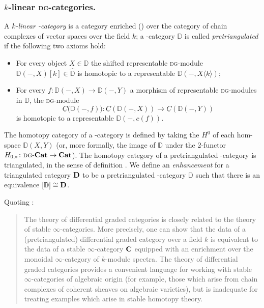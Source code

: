 \subsubsection{$k$\hyp{}linear \textsc{dg}\hyp{}categories.}
A \emph{$k$\hyp{}linear \dg\hyp{}category} is a category enriched (\cite{kelly1982basic,nashphd}) over the category of chain complexes of vector spaces over the field $k$; a \dg\hyp{}category $\mathbb{D}$ is called \emph{pretriangulated} if the following two axioms hold:
\begin{itemize}
\item For every object $X\in\mathbb{D}$ the shifted representable \textsc{dg}\hyp{}module $\mathbb{D}(-,X)[k]\in \widehat{\mathbb{D}}$ is homotopic to a representable $\mathbb{D}(-, X\langle k\rangle)$;
\item For every $f\colon \mathbb{D}(-,X)\to \mathbb{D}(-,Y)$ a morphism of representable \textsc{dg}\hyp{}modules in $\widehat{\mathbb{D}}$, the \textsc{dg}\hyp{}module
\[
\underline C\big(\mathbb{D}(-,f) \big)\colon \underline C(\mathbb{D}(-,X))\to \underline C(\mathbb{D}(-,Y))
\]
is homotopic to a representable $\mathbb{D}(-, c(f))$.
\end{itemize}
The homotopy category of a \dg\hyp{}category is defined by taking the $H^0$ of each hom-space $\mathbb{D}(X,Y)$ (or, more formally, the image of $\mathbb{D}$ under the 2\hyp{}functor $H_{0,*}\colon \text{\scshape dg}\text{-}\textbf{Cat}\to \textbf{Cat}$). The homotopy category of a pretriangulated \dg\hyp{}category is triangulated, in the sense of definition . We define an \emph{enhancement} for a triangulated category $\textbf{D}$ to be a pretriangulated \dg\hyp{}category $\mathbb{D}$ such that there is an equivalence $[\mathbb{D}]\cong \textbf{D}$.

Quoting \cite{LurieHA}:
\begin{quote}
The theory of differential graded categories is closely related to the theory of stable $\infty$\hyp{}categories. More precisely, one can show that the data of a (pretriangulated) differential graded category over a field $k$ is equivalent to the data of a stable $\infty$\hyp{}category $\textbf{C}$ equipped with an enrichment over the monoidal $\infty$\hyp{}category of $k$\hyp{}module spectra. The theory of differential graded categories provides a convenient language for working with stable $\infty$\hyp{}categories of algebraic origin (for example, those which arise from chain complexes of coherent sheaves on algebraic varieties), but is inadequate for treating examples which arise in stable homotopy theory.
\end{quote}
